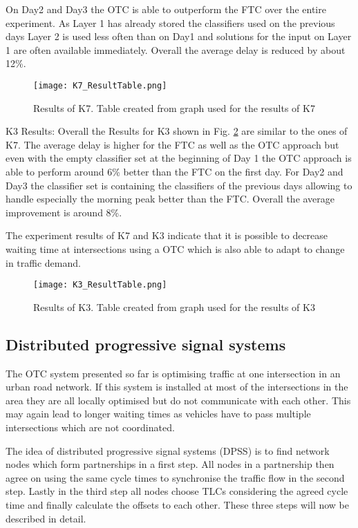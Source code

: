 On Day2 and Day3 the OTC is able to outperform the FTC over the entire experiment. As Layer 1 has already stored the classifiers used on the previous days Layer 2 is used less often than on Day1 and solutions for the input on Layer 1 are often available immediately. Overall the average delay is reduced by about 12\%.\cite{organic1}

\begin{figure} [!htb]
	\centering
	\texttt{[image: K7\_ResultTable.png]}
	\caption{Results of K7. Table created from graph used for the results of K7 \cite{organic1}}
	\label{fig:K7result}
\end{figure}

K3 Results: Overall the Results for K3 shown in Fig. \ref{fig:K3result} are similar to the ones of K7. The average delay is higher for the FTC as well as the OTC approach but even with the empty classifier set at the beginning of Day 1 the OTC approach is able to perform around 6\% better than the FTC on the first day. For Day2 and Day3 the classifier set is containing the classifiers of the previous days allowing to handle especially the morning peak better than the FTC. Overall the average improvement is around 8\%.\cite{organic1}

The experiment results of K7 and K3 indicate that it is possible to decrease waiting time at intersections using a OTC which is also able to adapt to change in traffic demand.

\begin{figure} [!htb]
	\centering
	\texttt{[image: K3\_ResultTable.png]}
	\caption{Results of K3. Table created from graph used for the results of K3 \cite{organic1}}
	\label{fig:K3result}
\end{figure}

\subsection{Distributed progressive signal systems}
The OTC system presented so far is optimising traffic at one intersection in an urban road network. If this system is installed at most of the intersections in the area they are all locally optimised but do not communicate with each other. This may again lead to longer waiting times as vehicles have to pass multiple intersections which are not coordinated.\cite{organic1}\cite{organicRouting}

The idea of distributed progressive signal systems (DPSS) is to find network nodes which form partnerships in a first step.  All nodes in a partnership then agree on using the same cycle times to synchronise the traffic flow in the second step. Lastly in the third step all nodes choose TLCs considering the agreed cycle time and finally calculate the offsets to each other. These three steps will now be described in detail.

